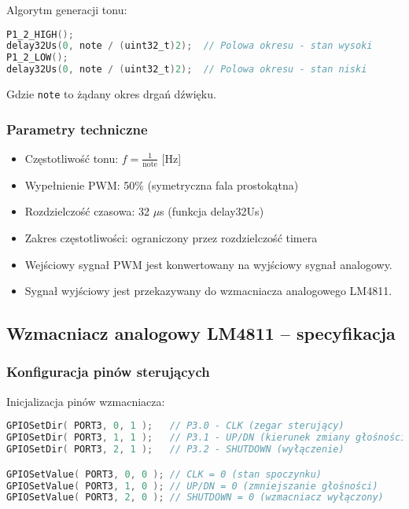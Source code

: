 \documentclass[letterpaper,11pt]{report}
\begin{document}
Algorytm generacji tonu:

\begin{lstlisting}[language=C]
P1_2_HIGH();
delay32Us(0, note / (uint32_t)2);  // Polowa okresu - stan wysoki
P1_2_LOW();
delay32Us(0, note / (uint32_t)2);  // Polowa okresu - stan niski
\end{lstlisting}

Gdzie \texttt{note} to żądany okres drgań dźwięku.

\subsubsection{Parametry techniczne}

\begin{itemize}
    \item Częstotliwość tonu: $f = \frac{1}{\text{note}}$ [Hz]
    \item Wypełnienie PWM: 50\% (symetryczna fala prostokątna)
    \item Rozdzielczość czasowa: 32 $\mu$s (funkcja delay32Us)
    \item Zakres częstotliwości: ograniczony przez rozdzielczość timera
\end{itemize}

\begin{itemize}
    \item Wejściowy sygnał PWM jest konwertowany na wyjściowy sygnał analogowy.
    \item Sygnał wyjściowy jest przekazywany do wzmacniacza analogowego LM4811.
\end{itemize}

\subsection{Wzmacniacz analogowy LM4811 -- specyfikacja}

\subsubsection{Konfiguracja pinów sterujących}

Inicjalizacja pinów wzmacniacza:
\begin{lstlisting}[language=C]
GPIOSetDir( PORT3, 0, 1 );   // P3.0 - CLK (zegar sterujący)
GPIOSetDir( PORT3, 1, 1 );   // P3.1 - UP/DN (kierunek zmiany głośności)
GPIOSetDir( PORT3, 2, 1 );   // P3.2 - SHUTDOWN (wyłączenie)

GPIOSetValue( PORT3, 0, 0 ); // CLK = 0 (stan spoczynku)
GPIOSetValue( PORT3, 1, 0 ); // UP/DN = 0 (zmniejszanie głośności)
GPIOSetValue( PORT3, 2, 0 ); // SHUTDOWN = 0 (wzmacniacz wyłączony)
\end{lstlisting}
\end{document}
